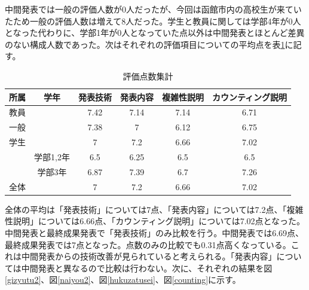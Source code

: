 中間発表では一般の評価人数が0人だったが、今回は函館市内の高校生が来ていたため一般の評価人数は増えて8人だった。学生と教員に関しては学部4年が0人となった代わりに、学部1年が0人となっていた点以外は中間発表とほとんど差異のない構成人数であった。次はそれぞれの評価項目についての平均点を表\ref{tab:point2}に記す。
\begin{table}[H]
\begin{center}
\caption{評価点数集計}
\begin{tabular}{|c|c|c|c|c|c|} \hline
  所属 & 学年 & 発表技術 & 発表内容 & 複雑性説明 & カウンティング説明  \\ \hline \hline
  教員 &        & 7.42 & 7.14 & 7.14 & 6.71 \\ 
  一般 &        & 7.38 & 7 & 6.12 & 6.75 \\
  学生 &        & 7 & 7.2 & 6.66 & 7.02 \\
         & 学部1,2年 & 6.5 & 6.25 & 6.5 & 6.5 \\
         & 学部3年 & 6.87 & 7.39 & 6.7 & 7.26 \\ \hline \hline
  全体 &        & 7 & 7.2 & 6.66 & 7.02 \\ \hline
\end{tabular}
\label{tab:point2}
\end{center}
\end{table}

全体の平均は「発表技術」については7点、「発表内容」については7.2点、「複雑性説明」については6.66点、「カウンティング説明」については7.02点となった。中間発表と最終成果発表で「発表技術」のみ比較を行う。中間発表では6.69点、最終成果発表では7点となった。点数のみの比較でも0.31点高くなっている。これは中間発表からの技術改善が見られていると考えられる。「発表内容」については中間発表と異なるので比較は行わない。次に、それぞれの結果を図\ref{gizyutu2}、図\ref{naiyou2}、図\ref{hukuzatusei}、図\ref{counting}に示す。

